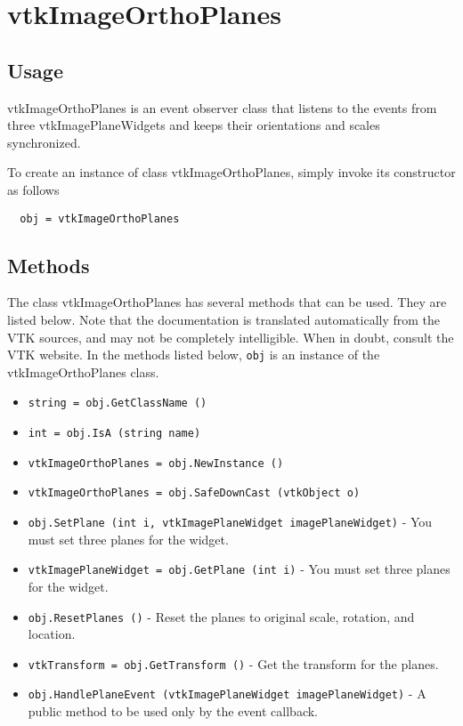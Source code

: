 \section{vtkImageOrthoPlanes}

\subsection{Usage}

 vtkImageOrthoPlanes is an event observer class that listens to the
 events from three vtkImagePlaneWidgets and keeps their orientations
 and scales synchronized.

To create an instance of class vtkImageOrthoPlanes, simply
invoke its constructor as follows
\begin{verbatim}
  obj = vtkImageOrthoPlanes
\end{verbatim}
\subsection{Methods}

The class vtkImageOrthoPlanes has several methods that can be used.
  They are listed below.
Note that the documentation is translated automatically from the VTK sources,
and may not be completely intelligible.  When in doubt, consult the VTK website.
In the methods listed below, \verb|obj| is an instance of the vtkImageOrthoPlanes class.
\begin{itemize}
\item  \verb|string = obj.GetClassName ()|

\item  \verb|int = obj.IsA (string name)|

\item  \verb|vtkImageOrthoPlanes = obj.NewInstance ()|

\item  \verb|vtkImageOrthoPlanes = obj.SafeDownCast (vtkObject o)|

\item  \verb|obj.SetPlane (int i, vtkImagePlaneWidget imagePlaneWidget)| -  You must set three planes for the widget.

\item  \verb|vtkImagePlaneWidget = obj.GetPlane (int i)| -  You must set three planes for the widget.

\item  \verb|obj.ResetPlanes ()| -  Reset the planes to original scale, rotation, and location.

\item  \verb|vtkTransform = obj.GetTransform ()| -  Get the transform for the planes.

\item  \verb|obj.HandlePlaneEvent (vtkImagePlaneWidget imagePlaneWidget)| -  A public method to be used only by the event callback.

\end{itemize}
